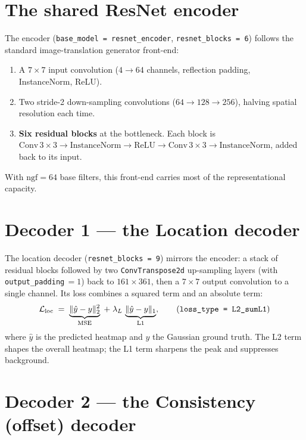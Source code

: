 \documentclass[11pt,a4paper]{article}
\begin{document}
\section{The shared ResNet encoder}

The encoder (\texttt{base\_model = resnet\_encoder}, \texttt{resnet\_blocks = 6}) follows the
standard image-translation generator front-end:
\begin{enumerate}[nosep]
  \item A $7\times7$ input convolution ($4 \to 64$ channels, reflection padding, InstanceNorm,
  ReLU).
  \item Two stride-2 down-sampling convolutions ($64\to128\to256$), halving spatial resolution
  each time.
  \item \textbf{Six residual blocks} at the bottleneck. Each block is
  $\text{Conv}\,3\times3 \to \text{InstanceNorm} \to \text{ReLU} \to \text{Conv}\,3\times3 \to
  \text{InstanceNorm}$, added back to its input.
\end{enumerate}
With $\text{ngf}=64$ base filters, this front-end carries most of the representational capacity.

\section{Decoder 1 --- the Location decoder}

The location decoder (\texttt{resnet\_blocks = 9}) mirrors the encoder: a stack of residual
blocks followed by two \texttt{ConvTranspose2d} up-sampling layers (with
\texttt{output\_padding}\,$=1$) back to $161\times361$, then a $7\times7$ output convolution to a
single channel. Its loss combines a squared term and an absolute term:
\begin{equation}
\mathcal{L}_{\text{loc}} \;=\; \underbrace{\lVert \hat{y}-y\rVert_2^2}_{\text{MSE}}
\;+\; \lambda_{L}\,\underbrace{\lVert \hat{y}-y\rVert_1}_{\text{L1}}, \qquad
\text{(\texttt{loss\_type = L2\_sumL1})}
\end{equation}
where $\hat y$ is the predicted heatmap and $y$ the Gaussian ground truth. The L2 term shapes the
overall heatmap; the L1 term sharpens the peak and suppresses background.

\section{Decoder 2 --- the Consistency (offset) decoder}
\label{sec:consistency}
\end{document}
